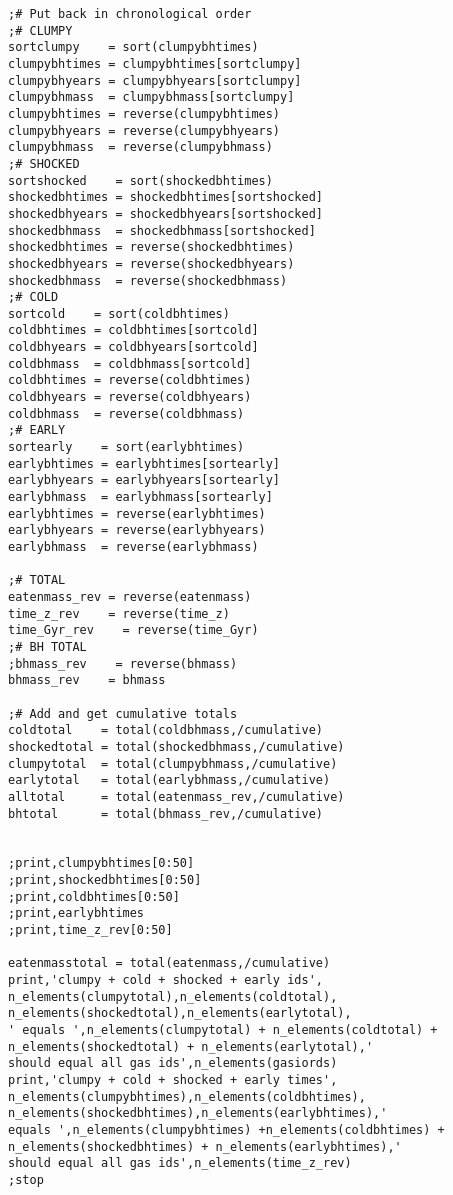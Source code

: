 \documentclass[12pt,headA,chapB]{fiskthesis}
\begin{document}
\begin{verbatim}
;# Put back in chronological order
;# CLUMPY
sortclumpy    = sort(clumpybhtimes)
clumpybhtimes = clumpybhtimes[sortclumpy]
clumpybhyears = clumpybhyears[sortclumpy]
clumpybhmass  = clumpybhmass[sortclumpy]
clumpybhtimes = reverse(clumpybhtimes)
clumpybhyears = reverse(clumpybhyears)
clumpybhmass  = reverse(clumpybhmass)
;# SHOCKED
sortshocked    = sort(shockedbhtimes)
shockedbhtimes = shockedbhtimes[sortshocked]
shockedbhyears = shockedbhyears[sortshocked]
shockedbhmass  = shockedbhmass[sortshocked]
shockedbhtimes = reverse(shockedbhtimes)
shockedbhyears = reverse(shockedbhyears)
shockedbhmass  = reverse(shockedbhmass)
;# COLD
sortcold    = sort(coldbhtimes)
coldbhtimes = coldbhtimes[sortcold]
coldbhyears = coldbhyears[sortcold]
coldbhmass  = coldbhmass[sortcold]
coldbhtimes = reverse(coldbhtimes)
coldbhyears = reverse(coldbhyears)
coldbhmass  = reverse(coldbhmass)
;# EARLY
sortearly    = sort(earlybhtimes)
earlybhtimes = earlybhtimes[sortearly]
earlybhyears = earlybhyears[sortearly]
earlybhmass  = earlybhmass[sortearly]
earlybhtimes = reverse(earlybhtimes)
earlybhyears = reverse(earlybhyears)
earlybhmass  = reverse(earlybhmass)

;# TOTAL
eatenmass_rev = reverse(eatenmass)
time_z_rev    = reverse(time_z)
time_Gyr_rev    = reverse(time_Gyr)
;# BH TOTAL
;bhmass_rev    = reverse(bhmass)
bhmass_rev    = bhmass

;# Add and get cumulative totals
coldtotal    = total(coldbhmass,/cumulative)
shockedtotal = total(shockedbhmass,/cumulative)
clumpytotal  = total(clumpybhmass,/cumulative)
earlytotal   = total(earlybhmass,/cumulative)
alltotal     = total(eatenmass_rev,/cumulative)
bhtotal      = total(bhmass_rev,/cumulative)


;print,clumpybhtimes[0:50]
;print,shockedbhtimes[0:50]
;print,coldbhtimes[0:50]
;print,earlybhtimes
;print,time_z_rev[0:50]

eatenmasstotal = total(eatenmass,/cumulative)
print,'clumpy + cold + shocked + early ids',
n_elements(clumpytotal),n_elements(coldtotal),
n_elements(shockedtotal),n_elements(earlytotal),
' equals ',n_elements(clumpytotal) + n_elements(coldtotal) + 
n_elements(shockedtotal) + n_elements(earlytotal),' 
should equal all gas ids',n_elements(gasiords)
print,'clumpy + cold + shocked + early times',
n_elements(clumpybhtimes),n_elements(coldbhtimes),
n_elements(shockedbhtimes),n_elements(earlybhtimes),' 
equals ',n_elements(clumpybhtimes) +n_elements(coldbhtimes) + 
n_elements(shockedbhtimes) + n_elements(earlybhtimes),' 
should equal all gas ids',n_elements(time_z_rev)
;stop



\end{verbatim}
\end{document}
